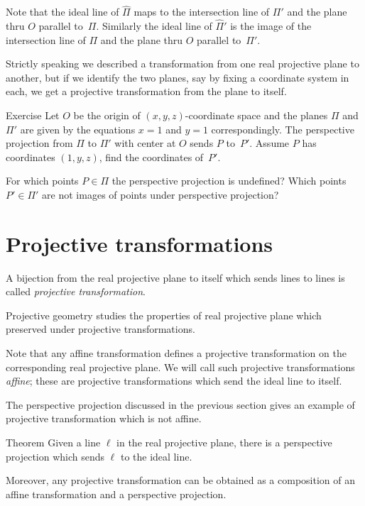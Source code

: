 Note that the ideal line of $\hat\Pi$ maps to the intersection line of $\Pi'$ and the plane thru $O$ parallel to~$\Pi$.
Similarly the ideal line of $\hat\Pi'$
is the image of the intersection line of $\Pi$ and the plane thru $O$ parallel to~$\Pi'$.

Strictly speaking we described a transformation from one real projective plane to another, 
but if we identify the two planes, say by fixing a coordinate system in each, 
we get a projective transformation from the plane to itself. 

\begin{thm}{Exercise}\label{ex:persect}
Let $O$ be the origin of $(x,y,z)$-coordinate space
and the planes $\Pi$ and $\Pi'$ are given by the equations
$x=1$ and $y=1$ correspondingly.
The perspective projection from $\Pi$ to $\Pi'$ with center at $O$ sends $P$ to~$P'$.
Assume $P$ has coordinates $(1,y,z)$, find the coordinates of~$P'$.

For which points $P\in \Pi$ the perspective projection is undefined?
Which points $P'\in\Pi'$ are not images of points under perspective projection?
\end{thm}

\section*{Projective transformations}

A bijection from the real projective plane to itself 
which sends lines to lines 
is called \emph{projective transformation}.

Projective geometry studies the properties of real projective plane which preserved under projective transformations.


Note that any affine transformation defines  a projective transformation on the corresponding real projective plane.
We will call such projective transformations \emph{affine}; 
these are projective transformations which send the ideal line to itself.

The perspective projection discussed in the previous section 
gives an example of projective transformation which is not affine.

\begin{thm}{Theorem}\label{thm:moving}
Given a line $\ell$ in the real projective plane, there is a perspective projection which sends $\ell$ to the ideal line.

Moreover, any projective transformation can be obtained as a composition of an affine transformation and a perspective projection.
\end{thm}

